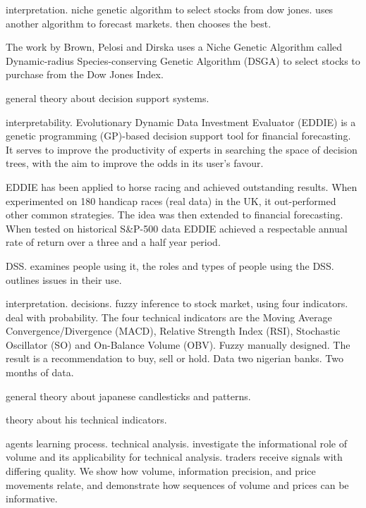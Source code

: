 \cite{Brown2013} interpretation. niche genetic algorithm to select stocks from
dow jones. uses another algorithm to forecast markets. then chooses the best.

The work by Brown, Pelosi and Dirska uses a Niche Genetic Algorithm called
Dynamic-radius Species-conserving Genetic Algorithm (DSGA) to select stocks to
purchase from the Dow Jones Index.

\cite{Keen1980} general theory about decision support systems.

\cite{Tsang2004} interpretability. Evolutionary Dynamic Data Investment
Evaluator (EDDIE) is a genetic programming (GP)-based decision support tool for
financial forecasting. It serves to improve the productivity of experts in
searching the space of decision trees, with the aim to improve the odds in its
user’s favour.

\cite{tsang1998eddie} EDDIE has been applied to horse racing and achieved
outstanding results. When experimented on 180 handicap races (real data) in the
UK, it out-performed other common strategies. The idea was then extended to
financial forecasting. When tested on historical S&P-500 data EDDIE achieved a
respectable annual rate of return over a three and a half year period.

\cite{Sprague1980} DSS. examines people using it, the roles and types of people
using the DSS. outlines issues in their use.

\cite{Ijegwa2014} interpretation. decisions. fuzzy inference to stock market,
using four indicators. deal with probability. The four technical indicators are
the Moving Average Convergence/Divergence (MACD), Relative Strength Index (RSI),
Stochastic Oscillator (SO) and On-Balance Volume (OBV). Fuzzy manually
designed. The result is a recommendation to buy, sell or hold. Data two nigerian
banks. Two months of data.

\cite{Nison1991} general theory about japanese candlesticks and patterns.

\cite{Wilder1978} theory about his technical indicators.

\cite{Blume1994} agents learning process. technical analysis. investigate the
informational role of volume and its applicability for technical
analysis. traders receive signals with differing quality. We show how volume,
information precision, and price movements relate, and demonstrate how sequences
of volume and prices can be informative.

